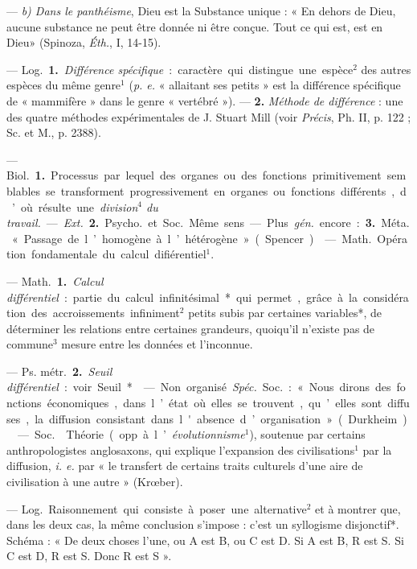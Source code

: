 \begin{itemize}[leftmargin=1cm, label=, itemsep=1pt]
— {\it b) Dans le panthéisme}, Dieu
est la Substance unique : « En dehors
de Dieu, aucune substance ne peut
être donnée ni être conçue. Tout ce
qui est, est en Dieu» (Spinoza, {\it Éth.},
I, 14-15).

 — \si{Log.} {\bf 1.} {\it Différence spécifique} : caractère qui distingue une
espèce$^2$ des autres espèces du même
genre$^1$ ({\it p. e.} « allaitant ses petits » est
la différence spécifique de « mammifère » dans le genre « vertébré »).
— {\bf 2.} {\it Méthode de différence} : une
des quatre méthodes expérimentales
de J. Stuart Mill (voir  {\it Précis}, Ph. II,
p. 122 ; Sc. et M., p. 2388).

 — \si{Biol.} {\bf 1.} Processus par lequel des organes ou des
fonctions primitivement semblables
se transforment progressivement en
organes ou fonctions différents, d’où
résulte une {\it division$^4$ du travail.} —
{\it Ext.} {\bf 2.} \si{Psycho.} et \si{Soc.} Même sens.
— Plus  {\it gén.} encore : {\bf 3.} \si{Méta.} « Passage de l’homogène à l’hétérogène »
(Spencer).

 — \si{Math.} Opération
fondamentale du calcul difiérentiel$^1$.

 — \si{Math.} {\bf 1.} {\it Calcul différentiel} : partie du calcul infinitésimal* qui permet, grâce à la considération des accroissements infiniment$^2$ petits subis par certaines
variables*, de déterminer les relations entre certaines grandeurs,
quoiqu'il n'existe pas de commune$^3$
mesure entre les données et l’inconnue.

— \si{Ps. métr.} {\bf 2.} {\it Seuil différentiel} :
voir Seuil*.

 — Non organisé. {\it Spéc.} \si{Soc.} :
« Nous dirons des fonctions économiques, dans l’état où elles se trouvent, qu’elles sont diffuses, la diffusion consistant dans l'absence d’organisation » (Durkheim).

 — \si{Soc.}  Théorie
(opp. à l’{\it évolutionnisme}$^1$), soutenue
par certains anthropologistes anglosaxons, qui explique l'expansion
des civilisations$^1$ par la diffusion,
{\it i. e.} par « le transfert de certains
traits culturels d'une aire de civilisation à une autre » (Krœber).

 — \si{Log.} Raisonnement qui
consiste à poser une alternative$^2$ et
à montrer que, dans les deux cas,
la même conclusion s'impose : c’est
un syllogisme disjonctif*. Schéma :
« De deux choses l’une, ou A est B,
ou C est D. Si A est B, R est S. Si
C est D, R est S. Donc R est S ».


\end{itemize}
